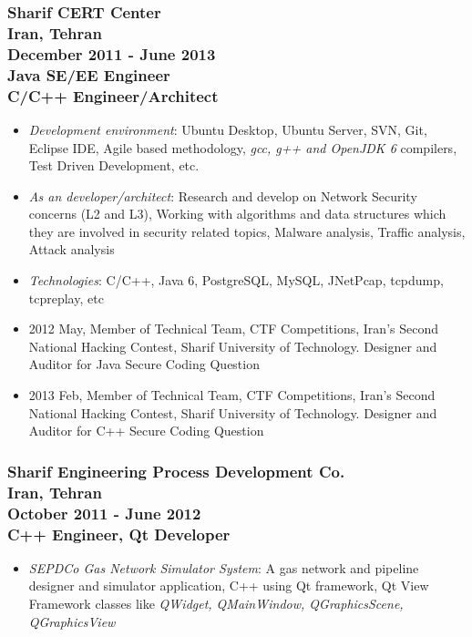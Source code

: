 \documentclass[10pt,a4paper]{article}
\begin{document}
\subsubsection{{\large Sharif CERT Center} \\ \textnormal{Iran, Tehran} \\ \textnormal{December 2011 - June 2013} \\ {Java SE/EE Engineer \\ C/C++ Engineer/Architect}}
  \setlength{\leftskip}{0.5cm}
  \setlength{\rightskip}{1cm}
	\begin{itemize}
		\setlength{\rightskip}{1cm}
    \setlength\itemsep{0em}
    \item \small \textit {Development environment}: Ubuntu Desktop, Ubuntu Server, SVN, Git, Eclipse IDE, Agile based methodology, \textit {gcc, g++ and OpenJDK 6} compilers, Test Driven Development, etc.
    \item \small \textit {As an developer/architect}: Research and develop on Network Security concerns (L2 and L3), Working with algorithms and data structures which they are involved in security related topics, Malware analysis, Traffic analysis, Attack analysis
    \item \small \textit {Technologies}: C/C++, Java 6, PostgreSQL, MySQL, JNetPcap, tcpdump, tcpreplay, etc
		\item \small 2012 May, Member of Technical Team, CTF Competitions, Iran's Second National Hacking Contest, Sharif University of Technology. Designer and Auditor for Java Secure Coding Question
		\item \small 2013 Feb, Member of Technical Team, CTF Competitions, Iran's Second National Hacking Contest, Sharif University of Technology. Designer and Auditor for C++ Secure Coding Question
	\end{itemize}
  \setlength{\leftskip}{0pt}
  \setlength{\rightskip}{0cm}
	  
\subsubsection{{\large Sharif Engineering Process Development Co.} \\ \textnormal{Iran, Tehran} \\ \textnormal{October 2011 - June 2012} \\ {C++ Engineer, Qt Developer}}
  \setlength{\leftskip}{0.5cm}
  \setlength{\rightskip}{1cm}
  \begin{itemize}
    \setlength{\rightskip}{1cm}
    \setlength\itemsep{0em}
		\item \small \textit{SEPDCo Gas Network Simulator System}: A gas network and pipeline designer and simulator application, C++ using Qt framework, Qt View Framework classes like \textit {QWidget, QMainWindow, QGraphicsScene, QGraphicsView}
  \end{itemize}
  \setlength{\leftskip}{0pt}
  \setlength{\rightskip}{0cm}
\end{document}
